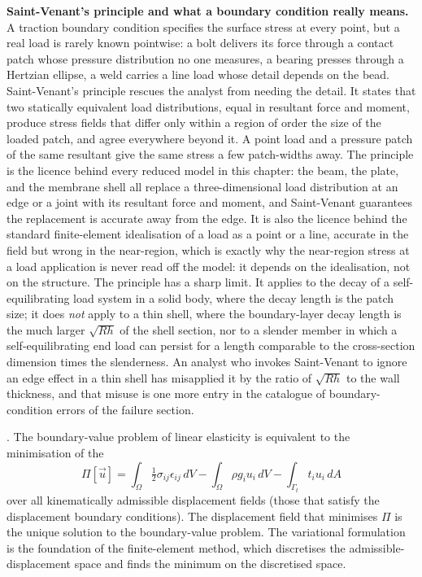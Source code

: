\begin{mastery}
\textbf{Saint-Venant's principle and what a boundary condition really
means.} A traction boundary condition specifies the surface stress at
every point, but a real load is rarely known pointwise: a bolt delivers
its force through a contact patch whose pressure distribution no one
measures, a bearing presses through a Hertzian ellipse, a weld carries a
line load whose detail depends on the bead. Saint-Venant's principle
rescues the analyst from needing the detail. It states that two
statically equivalent load distributions, equal in resultant force and
moment, produce stress fields that differ only within a region of order
the size of the loaded patch, and agree everywhere beyond it. A point
load and a pressure patch of the same resultant give the same stress a
few patch-widths away. The principle is the licence behind every
reduced model in this chapter: the beam, the plate, and the membrane
shell all replace a three-dimensional load distribution at an edge or a
joint with its resultant force and moment, and Saint-Venant guarantees
the replacement is accurate away from the edge. It is also the licence
behind the standard finite-element idealisation of a load as a point or
a line, accurate in the field but wrong in the near-region, which is
exactly why the near-region stress at a load application is never read
off the model: it depends on the idealisation, not on the structure.
The principle has a sharp limit. It applies to the decay of a
self-equilibrating load system in a solid body, where the decay length
is the patch size; it does \emph{not} apply to a thin shell, where the
boundary-layer decay length is the much larger $\sqrt{Rh}$ of the shell
section, nor to a slender member in which a self-equilibrating end load
can persist for a length comparable to the cross-section dimension
times the slenderness. An analyst who invokes Saint-Venant to ignore an
edge effect in a thin shell has misapplied it by the ratio of
$\sqrt{Rh}$ to the wall thickness, and that misuse is one more entry in
the catalogue of boundary-condition errors of the failure section.
\end{mastery}

. The boundary-value problem of
linear elasticity is equivalent to the minimisation of the
\[
\Pi[\vec{u}] = \int_\Omega \tfrac{1}{2} \sigma_{ij} \epsilon_{ij}
\,dV - \int_\Omega \rho g_i u_i \,dV - \int_{\Gamma_t} t_i u_i \,dA
\]
over all kinematically admissible displacement fields (those that
satisfy the displacement boundary conditions). The displacement
field that minimises $\Pi$ is the unique solution to the
boundary-value problem. The variational formulation is the
foundation of the finite-element method, which discretises the
admissible-displacement space and finds the minimum on the
discretised space.

